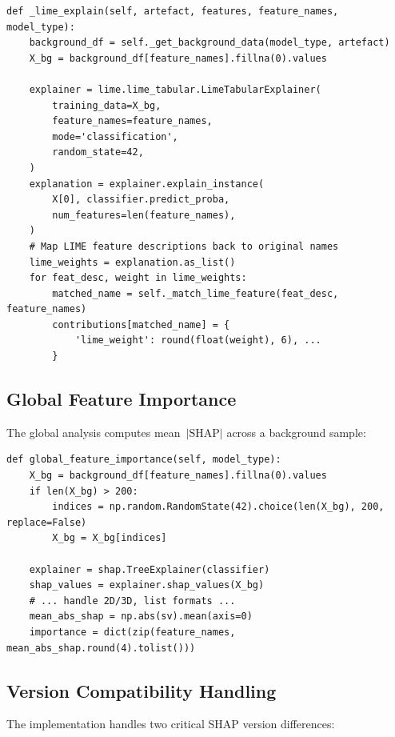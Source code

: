 \documentclass[12pt,a4paper]{report}
\begin{document}
\begin{lstlisting}[caption={LIME instance explanation (simplified)},label={lst:lime_explain}]
def _lime_explain(self, artefact, features, feature_names, model_type):
    background_df = self._get_background_data(model_type, artefact)
    X_bg = background_df[feature_names].fillna(0).values

    explainer = lime.lime_tabular.LimeTabularExplainer(
        training_data=X_bg,
        feature_names=feature_names,
        mode='classification',
        random_state=42,
    )
    explanation = explainer.explain_instance(
        X[0], classifier.predict_proba,
        num_features=len(feature_names),
    )
    # Map LIME feature descriptions back to original names
    lime_weights = explanation.as_list()
    for feat_desc, weight in lime_weights:
        matched_name = self._match_lime_feature(feat_desc, feature_names)
        contributions[matched_name] = {
            'lime_weight': round(float(weight), 6), ...
        }
\end{lstlisting}

\subsection{Global Feature Importance}

The global analysis computes mean~$|\text{SHAP}|$ across a background sample:

\begin{lstlisting}[caption={Global SHAP importance computation},label={lst:global_shap}]
def global_feature_importance(self, model_type):
    X_bg = background_df[feature_names].fillna(0).values
    if len(X_bg) > 200:
        indices = np.random.RandomState(42).choice(len(X_bg), 200, replace=False)
        X_bg = X_bg[indices]

    explainer = shap.TreeExplainer(classifier)
    shap_values = explainer.shap_values(X_bg)
    # ... handle 2D/3D, list formats ...
    mean_abs_shap = np.abs(sv).mean(axis=0)
    importance = dict(zip(feature_names, mean_abs_shap.round(4).tolist()))
\end{lstlisting}

\subsection{Version Compatibility Handling}

The implementation handles two critical SHAP version differences:
\end{document}

